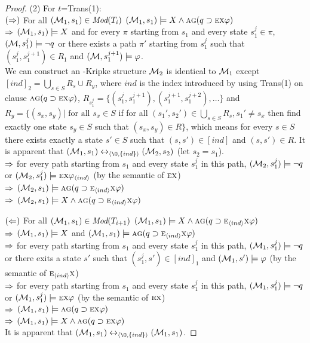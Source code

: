 \documentclass[letterpaper]{article}
\begin{document}
\begin{proof}
(2) For $t$=Trans(1):\\
$(\Rightarrow)$ For all $({\cal M}_1,s_1) \in \textit{Mod}(T_i)$ \ie $({\cal M}_1, s_1) \models X \wedge \textsc{a}\textsc{g}(q \supset \textsc{e} \textsc{x} \varphi)$\\
$\Rightarrow$ $({\cal M}_1,s_1)\models X$ and for every $\pi$ starting from $s_1$ and every state $s_1^j \in \pi$, $({\cal M},s_1^j) \models \neg q$ or there exists a path $\pi'$ starting from $s_1^j$ such that  $(s_1^j,s_1^{j+1})\in R_1$ and $({\cal M},s_1^{j+1})\models \varphi$.\\
We can construct an \Ind-Kripke structure ${\cal M}_2$ is identical to ${\cal M}_1$ except  $[ind]_2= \bigcup_{s\in S} R_s \cup R_y$, where $ind$ is the index introduced by using Trans(1) on clause $\textsc{a}\textsc{g}(q \supset \textsc{e} \textsc{x} \varphi)$, $R_{s_1^{j}}=\{(s_1^{j},s_1^{j+1}), (s_1^{j+1}, s_1^{j+2}),\dots\}$ and $R_y=\{(s_x,s_y)| \text{ for all } s_x \in S$ if for all $(s_1',s_2')\in \bigcup_{s\in S} R_s, s_1'\neq s_x$ then find exactly one state $s_y\in S$ such that $(s_x,s_y)\in R\}$, which means for every $s\in S$ there exists exactly a state $s'\in S$ such that $(s,s')\in [ind]$ and $(s,s')\in R$. It is apparent that $(\Hm_1, s_1) \lrto_{\tuple{{\O}, \{ind\}}} (\Hm_2, s_2)$ (let $s_2=s_1$).\\
$\Rightarrow$ for every path starting from $s_1$ and every state $s_1^j$ in this path, $({\cal M}_2, s_1^j) \models \neg q$ or $({\cal M}_2, s_1^j)\models \textsc{e} \textsc{x} \varphi_{{\langle{ind}\rangle}}$ \hfill (by the semantic of $\textsc{e} \textsc{x}$)\\
$\Rightarrow$ $({\cal M}_2, s_1) \models \textsc{a} \textsc{g}(q \supset \textsc{e}_{{\langle{ind}\rangle}} \textsc{x} \varphi )$\\
$\Rightarrow$ $({\cal M}_2, s_1) \models X \wedge \textsc{a} \textsc{g}(q \supset \textsc{e}_{{\langle{ind}\rangle}} \textsc{x} \varphi )$

$(\Leftarrow)$ For all $({\cal M}_1,s_1) \in \textit{Mod}(T_{i+1})$ \ie $({\cal M}_1,s_1) \models X \wedge \textsc{a} \textsc{g}(q \supset \textsc{e}_{{\langle{ind}\rangle}} \textsc{x} \varphi )$\\
$\Rightarrow$ $({\cal M}_1,s_1) \models X$ and $({\cal M}_1,s_1) \models \textsc{a} \textsc{g}(q \supset \textsc{e}_{{\langle{ind}\rangle}} \textsc{x} \varphi)$\\
$\Rightarrow$ for every path starting from $s_1$ and every state $s_1^j$ in this path, $({\cal M}_1, s_1^j) \models \neg q$ or there exits a state $s'$ such that $(s_1^j, s')\in [ind]_1$ and $({\cal M}_1, s') \models \varphi$ \hfill (by the semantic of $\textsc{e}_{{\langle{ind}\rangle}} \textsc{x}$)\\
$\Rightarrow$ for every path starting from $s_1$ and every state $s_1^j$ in this path, $({\cal M}_1, s_1^j) \models \neg q$ or $({\cal M}_1, s_1^j) \models \textsc{e} \textsc{x} \varphi$ \hfill (by the semantic of $\textsc{e} \textsc{x}$)\\
$\Rightarrow$ $({\cal M}_1,s_1) \models \textsc{a}\textsc{g}(q \supset \textsc{e} \textsc{x} \varphi)$\\
$\Rightarrow$ $({\cal M}_1, s_1) \models X \wedge \textsc{a}\textsc{g}(q \supset \textsc{e} \textsc{x} \varphi)$\\
It is apparent that $(\Hm_1, s_1) \lrto_{\tuple{{\O}, \{ind\}}} (\Hm_1, s_1)$.


\end{proof}
\end{document}
